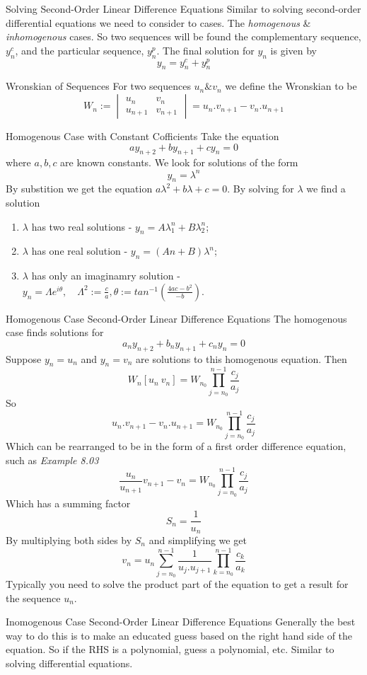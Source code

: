 \documentclass[11pt,a4paper]{article}
\begin{document}
\subtitle{Remark 8.06 - }{Solving Second-Order Linear Difference Equations}
Similar to solving second-order differential equations we need to consider to cases. The \textit{homogenous} \& \textit{inhomogenous} cases.
So two sequences will be found the complementary sequence, $y_n^c$, and the particular sequence, $y_n^p$. The final solution for $y_n$ is given by $$y_n = y_n^c + y_n^p$$

\subtitle{Definition 8.07 - }{Wronskian of Sequences}
For two sequences $u_n \& v_n$ we define the Wronskian to be $$W_n := \begin{vmatrix} u_n & v_n \\ u_{n+1} & v_{n+1} \end{vmatrix} = u_n.v_{n+1} - v_n.u_{n+1}$$

\subtitle{Theorem 8.08 - }{Homogenous Case with Constant Cofficients}
Take the equation $$ay_{n+2} + by_{n+1} + cy_n = 0$$ where $a, b, c$ are known constants. We look for solutions of the form $$y_n = \lambda^n$$
By substition we get the equation $a\lambda^2 + b\lambda + c = 0$. By solving for $\lambda$ we find a solution
\begin{enumerate}[label=\roman*)]
  \item $\lambda$ has two real solutions - $y_n = A\lambda_1^n + B\lambda_2^n$;
  \item $\lambda$ has one real solution - $y_n = (An + B)\lambda^n$;
  \item $\lambda$ has only an imaginamry solution - $y_n = \Lambda e^{i\theta},\quad \Lambda^2 := \frac{c}{a}, \theta := tan^{-1}(\frac{4ac - b^2}{-b})$.\\
\end{enumerate}

\subtitle{Theorem 8.09 - }{Homogenous Case Second-Order Linear Difference Equations}
The homogenous case finds solutions for $$a_ny_{n+2} + b_ny_{n+1} + c_ny_n = 0$$
Suppose $y_n = u_n$ and $y_n = v_n$ are solutions to this homogenous equation. Then $$W_n [u_n\ v_n] = W_{n_0}\prod_{j=n_0}^{n-1} \frac{c_j}{a_j}$$
So $$ u_n.v_{n+1} - v_n.u_{n+1} = W_{n_0}\prod_{j=n_0}^{n-1} \frac{c_j}{a_j}$$
Which can be rearranged to be in the form of a first order difference equation, such as \textit{Example 8.03}
$$\frac{u_n}{u_{n+1}}v_{n+1} - v_n = W_{n_0}\prod_{j=n_0}^{n-1} \frac{c_j}{a_j}$$
Which has a summing factor $$S_n = \frac{1}{u_n}$$
By multiplying both sides by $S_n$ and simplifying we get
$$v_n = u_n \sum_{j=n_0}^{n-1} \frac{1}{u_j.u_{j+1}} \prod_{k=n_0}^{n-1} \frac{c_k}{a_k}$$
Typically you need to solve the product part of the equation to get a result for the sequence $u_n$. \\

\subtitle{Remark 8.10 - }{Inomogenous Case Second-Order Linear Difference Equations}
Generally the best way to do this is to make an educated guess based on the right hand side of the equation.
So if the RHS is a polynomial, guess a polynomial, etc. Similar to solving differential equations.
\end{document}
